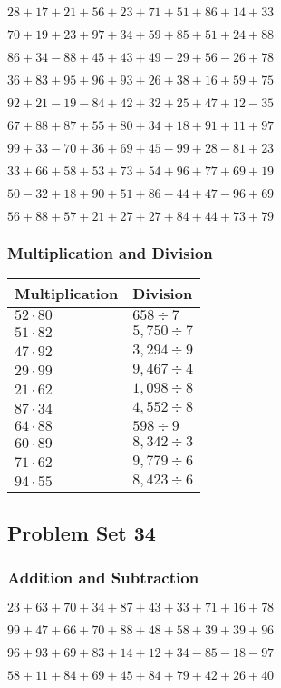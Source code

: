 \(28+17+21+56+23+71+51+86+14+ 33\)

\(70+19+23+97+34+59+85+51+24+88\)

\(86+34-88+45+43+49-29+56-26+78\)

\(36+83+95+96+93+26+38+16+59+75\)

\(92+21-19-84+42+32+25+47+12-35\)

\(67+88+87+55+80+34+18+91+11+97\)

\(99+33-70+36+69+45-99+28-81+23\)

\(33+66+58+53+73+54+96+77+69+19\)

\(50-32+18+90+51+86-44+47-96+69\)

\(56+88+57+21+27+27+84+44+73+79\)

\hypertarget{multiplication-and-division-73}{%
\subsubsection{Multiplication and
Division}\label{multiplication-and-division-73}}

\begin{longtable}[]{@{}ll@{}}
\toprule
Multiplication & Division\tabularnewline
\midrule
\endhead
\(52\cdot80\) & \(658÷7\)\tabularnewline
\(51\cdot82\) & \(5,750÷7\)\tabularnewline
\(47\cdot92\) & \(3,294÷9\)\tabularnewline
\(29\cdot99\) & \(9,467÷4\)\tabularnewline
\(21\cdot62\) & \(1,098÷8\)\tabularnewline
\(87\cdot34\) & \(4,552÷8\)\tabularnewline
\(64\cdot88\) & \(598÷9\)\tabularnewline
\(60\cdot89\) & \(8,342÷3\)\tabularnewline
\(71\cdot62\) & \(9,779÷6\)\tabularnewline
\(94\cdot55\) & \(8,423÷6\)\tabularnewline
\bottomrule
\end{longtable}

\hypertarget{problem-set-34-1}{%
\subsection{Problem Set 34}\label{problem-set-34-1}}

\hypertarget{addition-and-subtraction-74}{%
\subsubsection{Addition and
Subtraction}\label{addition-and-subtraction-74}}

\(23+63+70+34+87+43+33+71+16+ 78\)

\(99+47+66+70+88+48+58+39+39+96\)

\(96+93+69+83+14+12+34-85-18-97\)

\(58+11+84+69+45+84+79+42+26+40\)

